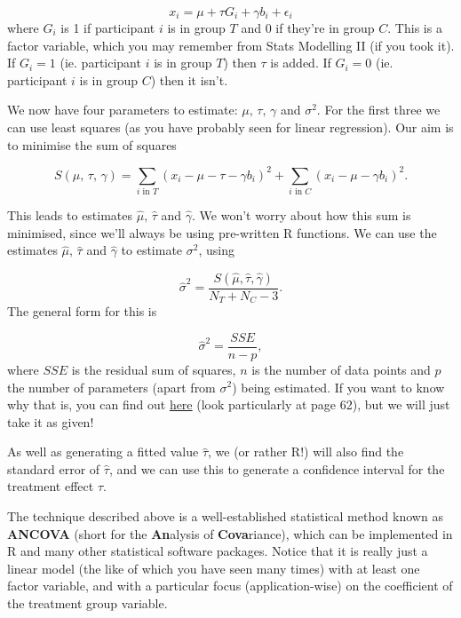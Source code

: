 \documentclass[
  openany]{book}
\theoremstyle{definition}
\theoremstyle{definition}
\theoremstyle{definition}
\theoremstyle{definition}
\theoremstyle{remark}
\begin{document}
\[ x_i = \mu + \tau G_i+ \gamma b_i + \epsilon_i \]
where \(G_i\) is 1 if participant \(i\) is in group \(T\) and 0 if they're in group \(C\). This is a factor variable, which you may remember from Stats Modelling II (if you took it). If \(G_i=1\) (ie. participant \(i\) is in group \(T\)) then \(\tau\) is added. If \(G_i=0\) (ie. participant \(i\) is in group \(C\)) then it isn't.

We now have four parameters to estimate: \(\mu,\,\tau,\,\gamma\) and \(\sigma^2\). For the first three we can use least squares (as you have probably seen for linear regression). Our aim is to minimise the sum of squares

\[S\left(\mu,\, \tau,\,\gamma\right) = \sum\limits_{i\text{ in }T} \left(x_i - \mu - \tau - \gamma b_i\right)^2 + \sum\limits_{i\text{ in }C} \left(x_i - \mu - \gamma b_i\right)^2.\]

This leads to estimates \(\hat{\mu},\, \hat{\tau}\) and \(\hat{\gamma}\). We won't worry about how this sum is minimised, since we'll always be using pre-written R functions. We can use the estimates \(\hat{\mu},\, \hat{\tau}\) and \(\hat{\gamma}\) to estimate \(\sigma^2\), using

\[\hat{\sigma}^2 = \frac{S\left(\hat{\mu},\hat{\tau}, \hat{\gamma}\right)}{N_T + N_C -3}.\]
The general form for this is

\[ \hat{\sigma}^2 = \frac{SSE}{n-p},\]
where \(SSE\) is the residual sum of squares, \(n\) is the number of data points and \(p\) the number of parameters (apart from \(\sigma^2\)) being estimated. If you want to know why that is, you can find out \href{https://pages.stern.nyu.edu/~wgreene/MathStat/GreeneChapter4.pdf}{here} (look particularly at page 62), but we will just take it as given!

As well as generating a fitted value \(\hat{\tau}\), we (or rather R!) will also find the standard error of \(\hat\tau\), and we can use this to generate a confidence interval for the treatment effect \(\tau\).

The technique described above is a well-established statistical method known as \textbf{ANCOVA} (short for the \textbf{An}alysis of \textbf{Cova}riance), which can be implemented in R and many other statistical software packages. Notice that it is really just a linear model (the like of which you have seen many times) with at least one factor variable, and with a particular focus (application-wise) on the coefficient of the treatment group variable.
\end{document}

